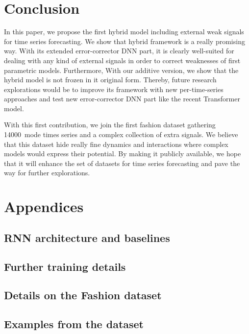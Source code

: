 \documentclass[letterpaper]{article} %
\newcommand{\numberts}{14000}
\begin{document}
\section{Conclusion}
\label{sec:discussion}
In this paper, we propose the first hybrid model including external weak signals for time series forecasting. We show that hybrid framework is a really promising way. With its extended error-corrector DNN part, it is clearly well-suited for dealing with any kind of external signals in order to correct weaknesses of first parametric models. Furthermore, With our additive version, we show that the hybrid model is not frozen in it original form. Thereby, future research explorations would be to improve its framework with new per-time-series approaches and test new error-corrector DNN part like the recent Transformer model.

With this first contribution, we join the first fashion dataset gathering \numberts\ mode times series and a complex collection of extra signals. We believe that this dataset hide really fine dynamics and interactions where complex models would express their potential. By making it publicly available, we hope that it will enhance the set of datasets for time series forecasting and pave the way for further explorations.



\section{Appendices}

\subsection{RNN architecture and baselines}
\label{section:architectures}

\subsection{Further training details}
\label{section:train_details}

\subsection{Details on the Fashion dataset}
\label{section:dataset_details}

\subsection{Examples from the dataset}
\label{section:examples}
\end{document}

